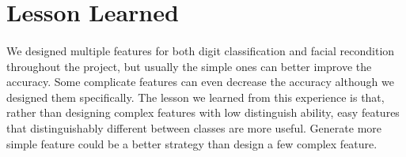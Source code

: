 \documentclass{article}
\begin{document}
\section*{Lesson Learned}
\paragraph*{}
We designed multiple features for both digit classification and facial recondition throughout the project, but usually the simple ones can better improve the accuracy. Some complicate features can even decrease the accuracy although we designed them specifically. The lesson we learned from this experience is that, rather than designing complex features with low distinguish ability, easy features that distinguishably different between classes are more useful. Generate more simple feature could be a better strategy than design a few complex feature.
\end{document}
